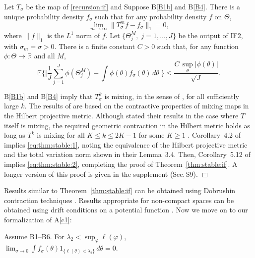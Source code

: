 \documentclass{pnastwo}\usepackage[]{graphicx}\usepackage[]{color}
\newcommand\SupSecThmDetails{S9}
\newcommand\mySection{{Sec.$\,$}}
\newcommand\levelii{{\lambda_2}}
\def\R{\mathbb{R}}
\newcommand\lik{\ell}
\newcommand\Thetaspace{{\bbTheta}}
\newcommand\listA{A}
\newcommand\listB{B}
\newcommand\Ca{C}
\newcommand{\bbTheta}{\Theta}
\newcommand\E{\mathbb{E}}
\begin{document}
\begin{article}
\begin{theorem}\label{thm:stable:if}
Let $T_\sigma$ be the map of \eqref{recursion:if} and 
Suppose \listB\ref{B1b} and \listB\ref{B4}.
There is a unique probability density $f_\sigma$ such that for any probability density $f$ on $\Thetaspace$,
\begin{equation}\label{eq:thm:stable:1}
\lim_{m\to\infty} \|T_\sigma^m f - f_\sigma\|_1=0,
\end{equation}
where $\|f\|_1$ is the $L^1$ norm of $f$.  
Let $\{\Theta_j^M,\;j=1,\ldots,J\}$ be the output of IF2, with $\sigma_m=\sigma>0$.
There is a finite constant $\Ca>0$ such that, for any function $\phi:\Thetaspace\to\R$ and all $M$,
\begin{equation} %
\label{eq:thm:stable:2}
\E\bigg\{ \Big| \frac{1}{J}\sum_{j=1}^J\phi(\Theta^M_j) -\! \int \! \phi(\theta)f_\sigma(\theta)\, d\theta \Big| \bigg\}
\le \frac{\Ca \, \sup_\theta|\phi(\theta)|}{\sqrt{J}}.
\end{equation}
\end{theorem}
\listB\ref{B1b} and \listB\ref{B4} imply that $T_\sigma^k$ is mixing, in the sense of \cite{legland04}, for all sufficiently large $k$. 
The results of \cite{legland04} are based on the contractive properties of mixing maps in the Hilbert projective metric. 
Although \cite{legland04} stated their results in the case where $T$ itself is mixing, the required geometric contraction in the Hilbert metric holds as long as $T^k$ is mixing for all $K\le k\le 2K-1$ for some $K\ge 1$ \cite[Theorem~2.5.1]{eveson95}.
Corollary~4.2 of \cite{legland04} implies \eqref{eq:thm:stable:1}, noting the equivalence of the Hilbert projective metric and the total variation norm shown in their Lemma~3.4.
Then, Corollary~5.12 of \cite{legland04} implies \eqref{eq:thm:stable:2}, completing the proof of Theorem~\ref{thm:stable:if}. 
A longer version of this proof is given in the supplement ({\mySection}{\SupSecThmDetails}).
\hfill$\Box$

Results similar to Theorem~\ref{thm:stable:if} can be obtained using Dobrushin contraction techniques \cite{delmoral04saa}.
Results appropriate for non-compact spaces can be obtained using drift conditions on a potential function \cite{whiteley12}.
Now we move on to our formalization of \listA\ref{c1}:


\begin{theorem}\label{prop:q:if}
Assume \listB{1}--\listB{6}.
For $\levelii<\sup_\varphi\lik(\varphi)$, \\
$\lim_{\sigma\to 0} \int f_\sigma(\theta)1_{\{\lik(\theta)<\levelii\}}\, d\theta = 0$. 
\end{theorem}


\end{article}
\end{document}
